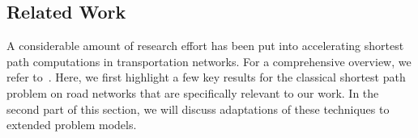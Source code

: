 \documentclass[manuscript,review]{acmart}
\begin{document}

\subsection{Related Work}\label{sec:related_work}

A considerable amount of research effort has been put into accelerating shortest path computations in transportation networks.
For a comprehensive overview, we refer to~\cite{bdgmpsww-rptn-16}.
Here, we first highlight a few key results for the classical shortest path problem on road networks that are specifically relevant to our work.
In the second part of this section, we will discuss adaptations of these techniques to extended problem models.
\end{document}

